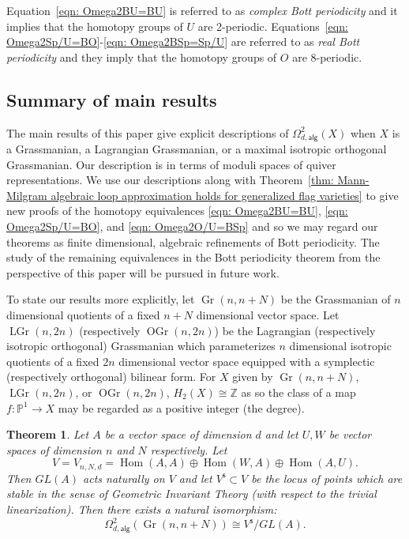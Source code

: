 \documentclass{amsart}
\newtheorem{theorem}{Theorem}[section]
\theoremstyle{definition}
\newcommand{\ZZ} {{\mathbb Z}}		%
\newcommand{\PP}{\mathbb{P}}
\newcommand{\Hom}{\operatorname{Hom}}
\newcommand{\alg}{\mathsf{alg}}
\newcommand{\stable}{\mathsf{s}}
\newcommand{\Gr}{\operatorname{Gr}}
\newcommand{\LGr}{\operatorname{LGr}}
\newcommand{\OGr}{\operatorname{OGr}}
\newcommand{\LoopTwo}{\Omega^{2}_{d,\alg}}
\begin{document}
Equation~\eqref{eqn: Omega2BU=BU} is referred to as \emph{complex Bott
periodicity} and it implies that the homotopy groups of $U$ are
2-periodic. Equations~\eqref{eqn: Omega2Sp/U=BO}-\eqref{eqn: Omega2BSp=Sp/U} 
are referred to as \emph{real Bott periodicity} and they imply that
the homotopy groups of $O$ are 8-periodic.

\subsection{Summary of main results}

The main results of this paper give explicit descriptions of $\LoopTwo
(X)$ when $X$ is a Grassmanian, a Lagrangian Grassmanian, or a maximal
isotropic orthogonal Grassmanian. Our description is in terms of
moduli spaces of quiver representations. We use our descriptions along
with Theorem~\ref{thm: Mann-Milgram algebraic loop approximation
holds for generalized flag varieties} to give new proofs of the
homotopy equivalences \eqref{eqn: Omega2BU=BU}, \eqref{eqn:
Omega2Sp/U=BO}, and \eqref{eqn: Omega2O/U=BSp} and so we may regard
our theorems as finite dimensional, algebraic refinements of Bott
periodicity. The study of the remaining equivalences in the Bott
periodicity theorem from the perspective of this paper will be pursued
in future work.

To state our results more explicitly, let $\Gr(n,n+N)$ be the
Grassmanian of $n$ dimensional quotients of a fixed $n+N$ dimensional
vector space.  Let $\LGr (n,2n)$ (respectively $\OGr (n,2n)$) be the
Lagrangian (respectively isotropic orthogonal) Grassmanian which
parameterizes $n$ dimensional isotropic  quotients of a fixed $2n$
dimensional vector space equipped with a symplectic (respectively
orthogonal) bilinear form. For $X$ given by $\Gr (n,n+N)$, $\LGr
(n,2n)$, or $\OGr (n,2n)$, $H_{2}(X)\cong \ZZ$ as so the class of a
map $f:\PP^{1}\to X$ may be regarded as a positive integer (the
degree).


\begin{theorem}\label{thm: quiver description of Loop2alg(Gr(n,n+N))}
Let $A$ be a vector space of dimension $d$ and let $U,W$ be vector
spaces of dimension $n$ and $N$ respectively. Let
\[
V=V_{n,N,d} =\Hom (A,A)\oplus \Hom (W,A)\oplus \Hom (A,U).
\]
Then $GL(A)$ acts naturally on $V$ and let $V^{\stable}\subset V$ be
the locus of points which are stable in the sense of Geometric
Invariant Theory (with respect to the trivial linearization). Then
there exists a natural isomorphism:
\[
\LoopTwo (\Gr (n,n+N))\cong V^{\stable}/GL(A).
\]
\end{theorem}
\end{document}
